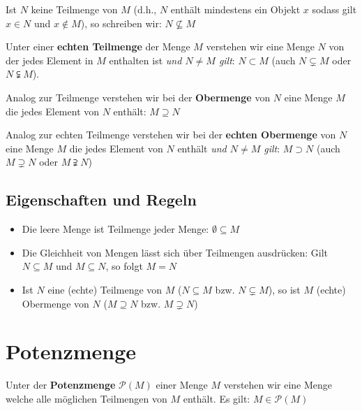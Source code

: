 \documentclass[../../main.tex]{subfiles}
\begin{document}
	Ist $N$ keine Teilmenge von $M$ (d.h., $N$ enthält mindestens ein Objekt $x$ sodass gilt $x \in N$ und $x \not\in M$), so schreiben wir: $N \not \subseteq M$

	\begin{definition}
		Unter einer \textbf{echten Teilmenge} der Menge $M$ verstehen wir eine Menge $N$ von der jedes Element in $M$ enthalten ist \textit{und $N \not= M$ gilt}: $N \subset M$ (auch $N \subsetneq M$ oder $N \subsetneqq M$). 
	\end{definition}

	\begin{definition}[Obermenge]
		Analog zur Teilmenge verstehen wir bei der \textbf{Obermenge} von $N$ eine Menge $M$ die jedes Element von $N$ enthält: $M \supseteq N$
	\end{definition}

	\begin{definition}
		Analog zur echten Teilmenge verstehen wir bei der \textbf{echten Obermenge} von $N$ eine Menge $M$ die jedes Element von $N$ enthält \textit{und $N \not= M$ gilt}: $M \supset N$ (auch $M \supsetneq N$ oder $M \supsetneqq N$)
	\end{definition}

	\subsection*{Eigenschaften und Regeln}
	\begin{itemize}
		\item Die leere Menge ist Teilmenge jeder Menge: $\emptyset \subseteq M$
		\item Die Gleichheit von Mengen lässt sich über Teilmengen ausdrücken: Gilt $N \subseteq M$ und $M \subseteq N$, so folgt $M = N$
		\item Ist $N$ eine (echte) Teilmenge von $M$ ($N \subseteq M$ bzw. $N \subsetneq M$), so ist $M$ (echte) Obermenge von $N$ ($M \supseteq N$ bzw. $M \supsetneq N$)
	\end{itemize}



	\section{Potenzmenge}
	
	\begin{definition}[Potenzmenge]
		Unter der \textbf{Potenzmenge} $\mathcal{P}(M)$ einer Menge $M$ verstehen wir eine Menge welche alle möglichen Teilmengen von $M$ enthält.  Es gilt: $M \in \mathcal{P}(M)$
	\end{definition}
	
\end{document}
